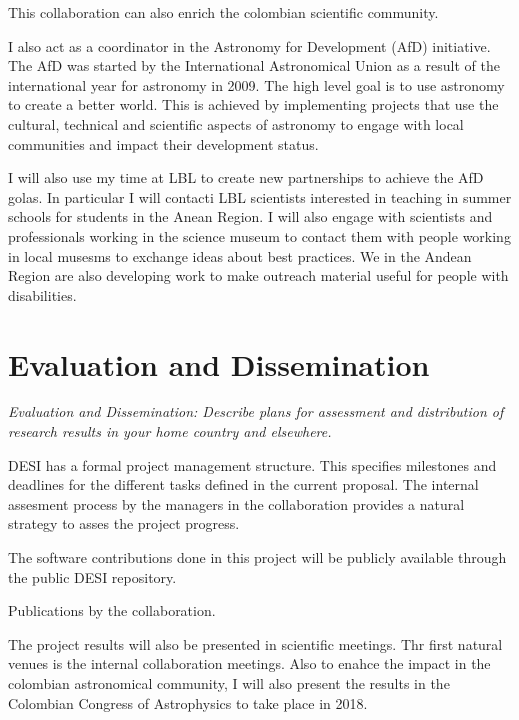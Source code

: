 \documentclass[12pt]{article}
\begin{document}
This collaboration can also enrich the colombian scientific
community.




I also act as a coordinator in the Astronomy for Development (AfD)
initiative. The AfD was started by the International Astronomical
Union as a result of the international year for astronomy in 2009.
The high level goal is to use astronomy to create a better world. 
This is achieved by implementing projects that use the cultural,
technical and scientific aspects of astronomy to engage with local
communities and impact their development status. 

I will also use my time at LBL to create new partnerships to achieve
the AfD golas. In particular I will contacti LBL scientists interested in
teaching in summer schools for students in the Anean Region. I will
also engage with scientists and professionals working in the science
museum to contact them with people working in local musesms to
exchange ideas about best practices. We in the Andean Region are also
developing work to make outreach material useful for people with
disabilities. 



\section*{Evaluation and Dissemination}
\textit{Evaluation and Dissemination: Describe plans for assessment and
distribution of research results in your home country and elsewhere.}


DESI has a formal project management structure. This specifies milestones
and deadlines for the different tasks defined in the current
proposal. The internal assesment process by the managers in the
collaboration provides a natural strategy to asses the project
progress. 

The software contributions done in this project will be publicly
available through the public DESI repository. 


Publications by the collaboration.


The project results will also be presented in scientific meetings. Thr
first natural venues is the internal collaboration meetings. Also to
enahce the impact in the colombian astronomical community, I will also 
present the results in the Colombian Congress of Astrophysics to take
place in 2018.  
\end{document}
